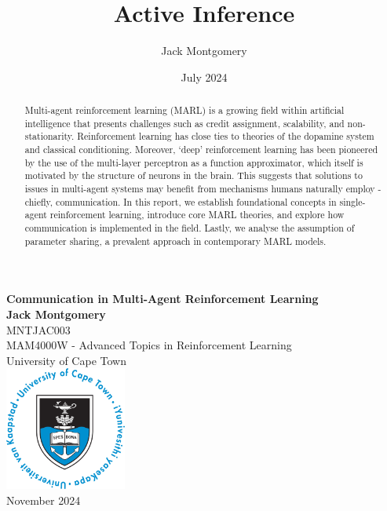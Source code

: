 \documentclass{article}
\title{Active Inference}
\author{Jack Montgomery}
\date{July 2024}
\begin{document}
\begin{titlepage}
    \centering
    \vspace*{1in}
    
    {\LARGE \textbf{Communication in Multi-Agent Reinforcement Learning}}\\[2cm]
    
    {\large \textbf{Jack Montgomery}}\\[0.5cm]
    {\large MNTJAC003}\\[0.5cm]
    {\large MAM4000W - Advanced Topics in Reinforcement Learning}\\ [0.5cm]
    {\large University of Cape Town}\\[2cm]
    
    \includegraphics[width=0.3\textwidth]{images/UCT_logo_circular_blue_large.png}\\[0.8cm]
    
    {\large November 2024}\\[1.4cm]
    
    \begin{abstract}
    Multi-agent reinforcement learning (MARL) is a growing field within artificial intelligence that presents challenges such as credit assignment, scalability, and non-stationarity. Reinforcement learning has close ties to theories of the dopamine system and classical conditioning. Moreover, `deep' reinforcement learning has been pioneered by the use of the multi-layer perceptron as a function approximator, which itself is motivated by the structure of neurons in the brain. This suggests that solutions to issues in multi-agent systems may benefit from mechanisms humans naturally employ - chiefly, communication. In this report, we establish foundational concepts in single-agent reinforcement learning, introduce core MARL theories, and explore how communication is implemented in the field. Lastly, we analyse the assumption of parameter sharing, a prevalent approach in contemporary MARL models.
    \end{abstract}
    
\end{titlepage}
\end{document}
